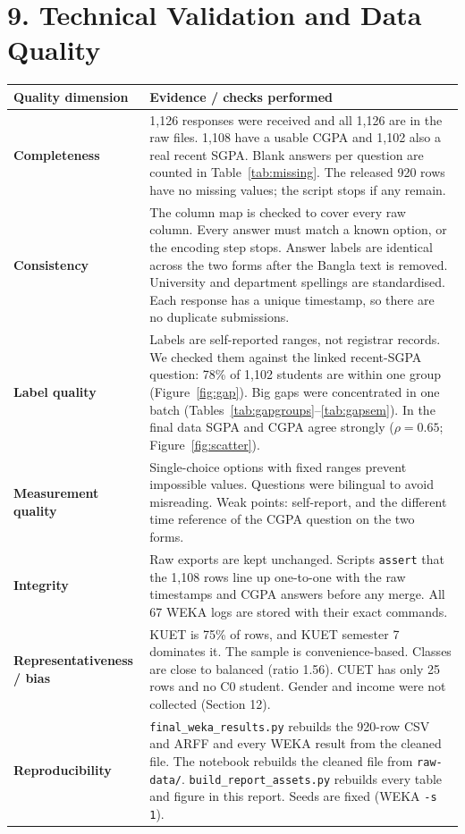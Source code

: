 \documentclass[11pt,a4paper]{article}
\newcommand{\hd}[1]{\textbf{#1}}
\begin{document}
\section{9. Technical Validation and Data Quality}
{\small
\begin{tabularx}{\linewidth}{|L{36mm}|Y|}
\hline
{}\hd{Quality dimension} & \hd{Evidence / checks performed} \\ \hline
\hd{Completeness} & 1,126 responses were received and all 1,126 are in the raw files. 1,108 have a usable CGPA and 1,102 also a real recent SGPA. Blank answers per question are counted in Table~\ref{tab:missing}. The released 920 rows have no missing values; the script stops if any remain. \\ \hline
\hd{Consistency} & The column map is checked to cover every raw column. Every answer must match a known option, or the encoding step stops. Answer labels are identical across the two forms after the Bangla text is removed. University and department spellings are standardised. Each response has a unique timestamp, so there are no duplicate submissions. \\ \hline
\hd{Label quality} & Labels are self-reported ranges, not registrar records. We checked them against the linked recent-SGPA question: 78\% of 1,102 students are within one group (Figure~\ref{fig:gap}). Big gaps were concentrated in one batch (Tables~\ref{tab:gapgroups}--\ref{tab:gapsem}). In the final data SGPA and CGPA agree strongly ($\rho=0.65$; Figure~\ref{fig:scatter}). \\ \hline
\hd{Measurement quality} & Single-choice options with fixed ranges prevent impossible values. Questions were bilingual to avoid misreading. Weak points: self-report, and the different time reference of the CGPA question on the two forms. \\ \hline
\hd{Integrity} & Raw exports are kept unchanged. Scripts \texttt{assert} that the 1,108 rows line up one-to-one with the raw timestamps and CGPA answers before any merge. All 67 WEKA logs are stored with their exact commands. \\ \hline
\hd{Representativeness / bias} & KUET is 75\% of rows, and KUET semester 7 dominates it. The sample is convenience-based. Classes are close to balanced (ratio 1.56). CUET has only 25 rows and no C0 student. Gender and income were not collected (Section 12). \\ \hline
\hd{Reproducibility} & \texttt{final\_weka\_results.py} rebuilds the 920-row CSV and ARFF and every WEKA result from the cleaned file. The notebook rebuilds the cleaned file from \texttt{raw-data/}. \texttt{build\_report\_assets.py} rebuilds every table and figure in this report. Seeds are fixed (WEKA \texttt{-s 1}). \\ \hline
\end{tabularx}}
\end{document}
